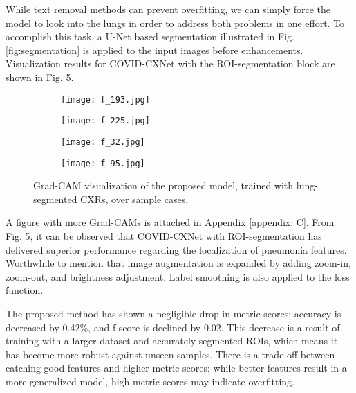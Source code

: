 \documentclass{article}
\begin{document}
While text removal methods can prevent overfitting, we can simply force the model to look into the lungs in order to address both problems in one effort. To accomplish this task, a U-Net based segmentation illustrated in Fig. \ref{fig:segmentation} is applied to the input images before enhancements. Visualization results for COVID-CXNet with the ROI-segmentation block are shown in Fig. \ref{fig:cxnet_v2_heatmaps}.

\begin{figure}[H]
    \begin{subfigure}{0.5\linewidth}
        \centering
        \texttt{[image: f\_193.jpg]}
        \label{fig:v2_ex1}
    \end{subfigure}
    \begin{subfigure}{0.5\linewidth}
        \centering
        \texttt{[image: f\_225.jpg]}
        \label{fig:v2_ex2}
    \end{subfigure}
    \begin{subfigure}{0.5\linewidth}
        \centering
        \texttt{[image: f\_32.jpg]}
        \label{fig:v2_ex3}
    \end{subfigure}
    \begin{subfigure}{0.5\linewidth}
        \centering
        \texttt{[image: f\_95.jpg]}
        \label{fig:v2_ex4}
    \end{subfigure}
\caption{Grad-CAM visualization of the proposed model, trained with lung-segmented CXRs, over sample cases.}
\label{fig:cxnet_v2_heatmaps}
\end{figure}

A figure with more Grad-CAMs is attached in Appendix \ref{appendix: C}. From Fig. \ref{fig:cxnet_v2_heatmaps}, it can be observed that COVID-CXNet with ROI-segmentation has delivered superior performance regarding the localization of pneumonia features. Worthwhile to mention that image augmentation is expanded by adding zoom-in, zoom-out, and brightness adjustment. Label smoothing is also applied to the loss function. 



The proposed method has shown a negligible drop in metric scores; accuracy is decreased by 0.42\%, and f-score is declined by 0.02. This decrease is a result of training with a larger dataset and accurately segmented ROIs, which means it has become more robust against unseen samples. There is a trade-off between catching good features and higher metric scores; while better features result in a more generalized model, high metric scores may indicate overfitting. 
\end{document}
